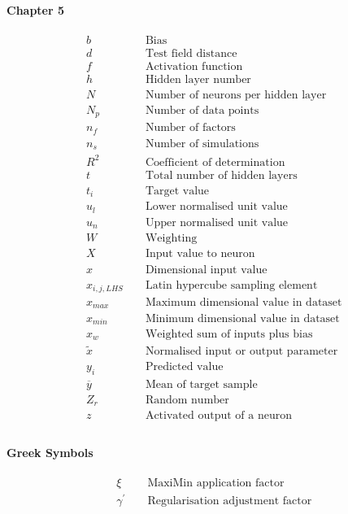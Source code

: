 \paragraph{Chapter 5}
\begin{align*}
	&b && \text { Bias } \\
	&d && \text { Test field distance } \\
	&f && \text { Activation function } \\
	&h && \text { Hidden layer number } \\
	&N && \text { Number of neurons per hidden layer } \\
	&N_p && \text { Number of data points } \\
	&n_f && \text { Number of factors } \\
	&n_s && \text { Number of simulations } \\
	&R^2 && \text { Coefficient of determination } \\
	&t && \text { Total number of hidden layers } \\
	&t_i && \text { Target value } \\
	&u_l && \text { Lower normalised unit value } \\
	&u_n && \text { Upper normalised unit value } \\
	&W && \text { Weighting } \\
	&X && \text { Input value to neuron } \\
	&x && \text { Dimensional input value } \\
	&x_{i,j,LHS} && \text { Latin hypercube sampling element } \\
	&x_{max} && \text { Maximum dimensional value in dataset } \\
	&x_{min} && \text { Minimum dimensional value in dataset } \\
	&x_w && \text { Weighted sum of inputs plus bias } \\
	&\tilde{x} && \text { Normalised input or output parameter } \\
	&y_i && \text { Predicted value } \\
	&\overline{y} && \text { Mean of target sample } \\
	&Z_r && \text { Random number } \\
	&z && \text { Activated output of a neuron } \\
\end{align*}

\paragraph{Greek Symbols}
\begin{align*}
	&\xi && \text { MaxiMin application factor } \\
	&\gamma^{\prime} && \text { Regularisation adjustment factor } \\
\end{align*}


